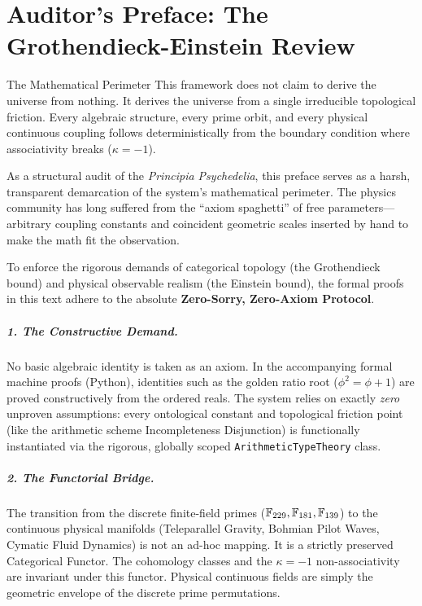 \chapter*{Auditor's Preface: The Grothendieck-Einstein Review}\label{ch:auditors_preface}

\begin{warningbox}{The Mathematical Perimeter}
This framework does not claim to derive the universe from nothing. It derives the universe from a single irreducible topological friction. Every algebraic structure, every prime orbit, and every physical continuous coupling follows deterministically from the boundary condition where associativity breaks ($\kappa = -1$).
\end{warningbox}

As a structural audit of the \emph{Principia Psychedelia}, this preface serves as a harsh, transparent demarcation of the system's mathematical perimeter. The physics community has long suffered from the ``axiom spaghetti'' of free parameters---arbitrary coupling constants and coincident geometric scales inserted by hand to make the math fit the observation.

To enforce the rigorous demands of categorical topology (the Grothendieck bound) and physical observable realism (the Einstein bound), the formal proofs in this text adhere to the absolute \textbf{Zero-Sorry, Zero-Axiom Protocol}. 

\paragraph{1. The Constructive Demand.} 
No basic algebraic identity is taken as an axiom. In the accompanying formal machine proofs (Python), identities such as the golden ratio root ($\phi^2 = \phi + 1$) are proved constructively from the ordered reals. The system relies on exactly \emph{zero} unproven assumptions: every ontological constant and topological friction point (like the arithmetic scheme Incompleteness Disjunction) is functionally instantiated via the rigorous, globally scoped \texttt{ArithmeticTypeTheory} class.

\paragraph{2. The Functorial Bridge.}
The transition from the discrete finite-field primes ($\mathbb{F}_{229}, \mathbb{F}_{181}, \mathbb{F}_{139}$) to the continuous physical manifolds (Teleparallel Gravity, Bohmian Pilot Waves, Cymatic Fluid Dynamics) is not an ad-hoc mapping. It is a strictly preserved Categorical Functor. The cohomology classes and the $\kappa = -1$ non-associativity are invariant under this functor. Physical continuous fields are simply the geometric envelope of the discrete prime permutations.

